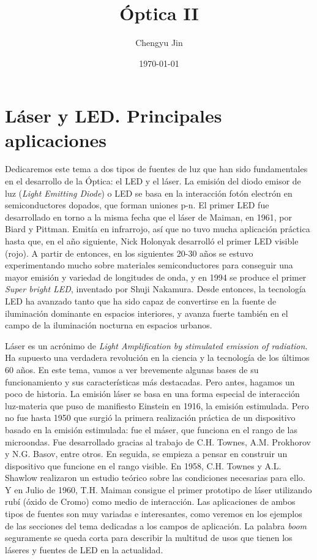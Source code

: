 \documentclass[12pt,a4paper]{report}
\title{Óptica II}
\author{Chengyu Jin}
\date{\today}
\newcommand{\esp}{\vspace{0.5cm}}
\begin{document}
	
	\maketitle
	
	\tableofcontents
	\newpage
	
	\chapter{Láser y LED. Principales aplicaciones}
	
	Dedicaremos este tema a dos tipos de fuentes de luz que han sido fundamentales en el desarrollo de la Óptica: el LED y el láser. La emisión del diodo emisor de luz (\textit{Light Emitting Diode}) o LED se basa en la interacción fotón electrón en semiconductores dopados, que forman uniones p-n. El primer LED fue desarrollado en torno a la misma fecha que el láser de Maiman, en 1961, por Biard y Pittman. Emitía en infrarrojo, así que no tuvo mucha aplicación práctica hasta que, en el año siguiente, Nick Holonyak desarrolló el primer LED visible (rojo). A partir de entonces, en los siguientes 20-30 años se estuvo experimentando mucho sobre materiales semiconductores para conseguir una mayor emisión y variedad de longitudes de onda, y en 1994 se produce el primer \textit{Super bright LED}, inventado por Shuji Nakamura. Desde entonces, la tecnología LED ha avanzado tanto que ha sido capaz de convertirse en la fuente de iluminación dominante en espacios interiores, y avanza fuerte también en el campo de la iluminación nocturna en espacios urbanos.
	
	\esp
	
	Láser es un acrónimo de \textit{Light Amplification by stimulated emission of radiation}. Ha supuesto una verdadera revolución en la ciencia y la tecnología de los últimos 60 años. En este tema, vamos a ver brevemente algunas bases de su funcionamiento y sus características más destacadas. Pero antes, hagamos un poco de historia. La emisión láser se basa en una forma especial de interacción luz-materia que puso de manifiesto Einstein en 1916, la emisión estimulada. Pero no fue hasta 1950 que surgió la primera realización práctica de un dispositivo basado en la emisión estimulada: fue el máser, que funciona en el rango de las microondas. Fue desarrollado gracias al trabajo de C.H. Townes, A.M. Prokhorov y N.G. Basov, entre otros. En seguida, se empieza a pensar en construir un dispositivo que funcione en el rango visible. En 1958, C.H. Townes y A.L. Shawlow realizaron un estudio teórico sobre las condiciones necesarias para ello. Y en Julio de 1960, T.H. Maiman consigue el primer prototipo de láser utilizando rubí (óxido de Cromo) como medio de interacción. Las aplicaciones de ambos tipos de fuentes son muy variadas e interesantes, como veremos en los ejemplos de las secciones del tema dedicadas a los campos de aplicación. La palabra \textit{boom} seguramente se queda corta para describir la multitud de usos que tienen los láseres y fuentes de LED en la actualidad.
	
\end{document}
